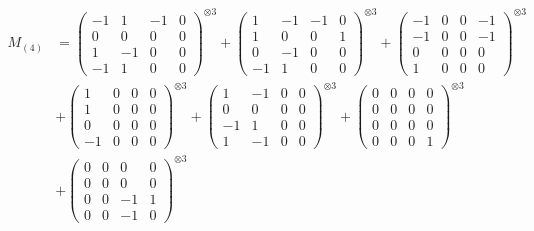 \documentclass{article}
\newcommand{\Mthree}{%
    M_{(4)}
}
\begin{document}
        \newpage
        
        \footnotesize{
        \begin{align}
        \Mthree
        &= \label{Rs16-Rc11-Solution-26-c1} \begin{pmatrix} -1 & 1 & -1 & 0 \\ 0 & 0 & 0 & 0 \\ 1 & -1 & 0 & 0 \\ -1 & 1 & 0 & 0 \end{pmatrix}^{\otimes 3} 
            + \begin{pmatrix} 1 & -1 & -1 & 0 \\ 1 & 0 & 0 & 1 \\ 0 & -1 & 0 & 0 \\ -1 & 1 & 0 & 0 \end{pmatrix}^{\otimes 3} 
            + \begin{pmatrix} -1 & 0 & 0 & -1 \\ -1 & 0 & 0 & -1 \\ 0 & 0 & 0 & 0 \\ 1 & 0 & 0 & 0 \end{pmatrix}^{\otimes 3} \\
        &+ \label{Rs16-Rc11-Solution-26-c4} \begin{pmatrix} 1 & 0 & 0 & 0 \\ 1 & 0 & 0 & 0 \\ 0 & 0 & 0 & 0 \\ -1 & 0 & 0 & 0 \end{pmatrix}^{\otimes 3} 
            + \begin{pmatrix} 1 & -1 & 0 & 0 \\ 0 & 0 & 0 & 0 \\ -1 & 1 & 0 & 0 \\ 1 & -1 & 0 & 0 \end{pmatrix}^{\otimes 3} 
            + \begin{pmatrix} 0 & 0 & 0 & 0 \\ 0 & 0 & 0 & 0 \\ 0 & 0 & 0 & 0 \\ 0 & 0 & 0 & 1 \end{pmatrix}^{\otimes 3} \\
        &+ \label{Rs16-Rc11-Solution-26-c7} \begin{pmatrix} 0 & 0 & 0 & 0 \\ 0 & 0 & 0 & 0 \\ 0 & 0 & -1 & 1 \\ 0 & 0 & -1 & 0 \end{pmatrix}^{\otimes 3} 

\end{align}}
\end{document}
